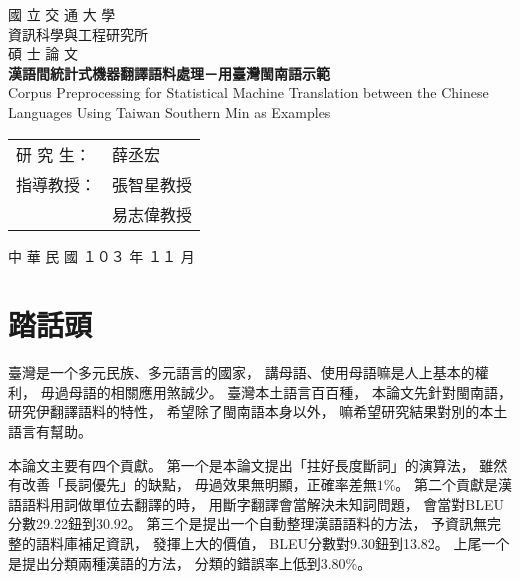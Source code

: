 \documentclass[final,oneside,onecolumn,12pt,a4paper]{book}%
\begin{document}
\begin{titlepage}

\begin{center}

   

\textsc{\Huge 國 立 交 通 大 學} %
\\[2em]
\textsc{\LARGE 資訊科學與工程研究所} %
\\[2em]
\textsc{\LARGE 碩 士 論 文} %
\\[3em]

{\huge \bfseries 漢語間統計式機器翻譯語料處理－用臺灣閩南語示範 } %
\\[1em]
{\LARGE Corpus Preprocessing for Statistical Machine Translation between the Chinese Languages Using Taiwan Southern Min as Examples}
\\[3em]

\begin{table}[H]
\centering
\Large
\begin{tabular}{ll}
研 究 生： & 薛丞宏\\ %
指導教授： & 張智星教授\\ %
 & 易志偉教授\\ %
\end{tabular}
\end{table}

\vfill

{\large 中 華 民 國  １０３  年  １１  月}

\end{center}

\end{titlepage}


\frontmatter
\chapter{踏話頭}
臺灣是一个多元民族、多元語言的國家，
講母語、使用母語嘛是人上基本的權利，
毋過母語的相關應用煞誠少。
臺灣本土語言百百種，
本論文先針對閩南語，
研究伊翻譯語料的特性，
希望除了閩南語本身以外，
嘛希望研究結果對別的本土語言有幫助。

本論文主要有四个貢獻。
第一个是本論文提出「拄好長度斷詞」的演算法，
雖然有改善「長詞優先」的缺點，
毋過效果無明顯，正確率差無$1\%$。
第二个貢獻是漢語語料用詞做單位去翻譯的時，
用斷字翻譯會當解決未知詞問題，
會當對BLEU分數29.22鈕到30.92。
第三个是提出一个自動整理漢語語料的方法，
予資訊無完整的語料庫補足資訊，
發揮上大的價值，
BLEU分數對9.30鈕到13.82。
上尾一个是提出分類兩種漢語的方法，
分類的錯誤率上低到$3.80\%$。
\end{document}
